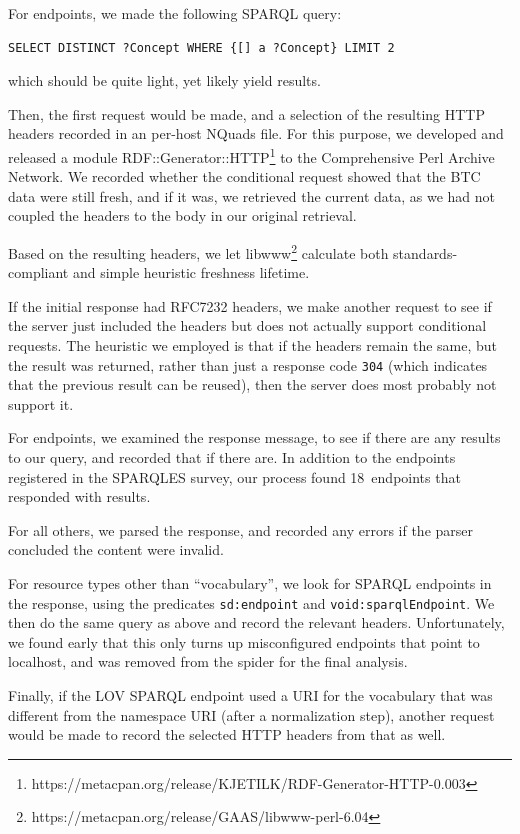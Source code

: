 \documentclass{llncs}
\newcommand{\rdfterm}[1]{\texttt{#1}}
\newcommand{\httph}[1]{\texttt{#1}}
\begin{document}
\begin{subappendices}
For endpoints, we made the following SPARQL query:
\begin{verbatim}
SELECT DISTINCT ?Concept WHERE {[] a ?Concept} LIMIT 2
\end{verbatim}
which should be quite light, yet likely yield results.

Then, the first request would be made, and a selection of the
resulting HTTP headers recorded in an per-host NQuads file. For this
purpose, we developed and released a module
RDF::Generator::HTTP\footnote{https://metacpan.org/release/KJETILK/RDF-Generator-HTTP-0.003}
to the Comprehensive Perl Archive Network. We recorded whether the
conditional request showed that the BTC data were still fresh, and if
it was, we retrieved the current data, as we had not coupled the
headers to the body in our original retrieval.

Based on the resulting headers, we let
libwww\footnote{https://metacpan.org/release/GAAS/libwww-perl-6.04}
calculate both standards-compliant and simple heuristic freshness
lifetime.

If the initial response had RFC7232 headers, we make another
request to see if the server just included the headers but does not
actually support conditional requests. The heuristic we employed is
that if the headers remain the same, but the result was returned,
rather than just a response code \httph{304} (which indicates that the
previous result can be reused), then the server does most probably not
support it.

For endpoints, we examined the response message, to see if there are
any results to our query, and recorded that if there are. In addition
to the endpoints registered in the SPARQLES survey, our process found
18~endpoints that responded with results.

For all others, we parsed the response, and recorded any errors if the
parser concluded the content were invalid.

For resource types other than ``vocabulary'', we look for SPARQL
endpoints in the response, using the predicates \rdfterm{sd:endpoint}
and \rdfterm{void:sparqlEndpoint}. We then do the same query as above
and record the relevant headers. Unfortunately, we found early that
this only turns up misconfigured endpoints that point to localhost,
and was removed from the spider for the final analysis.

Finally, if the LOV SPARQL endpoint used a URI for the vocabulary that
was different from the namespace URI (after a normalization step),
another request would be made to record the selected HTTP headers from
that as well.


\end{subappendices}
\end{document}
